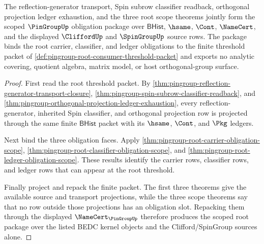 \begin{theorem}
\label{thm:pingroup-root-scoped-obligation-package}
The reflection-generator transport, Spin subrow classifier readback,
orthogonal projection ledger exhaustion, and the three root scope theorems
jointly form the scoped $\PinGroupUp$ obligation package over
$\mathsf{BHist}$, $\hsame$, $\Cont$, $\NameCert$, and the displayed
$\CliffordUp$ and $\SpinGroupUp$ source rows. The package binds the root
carrier, classifier, and ledger obligations to the finite threshold packet of
\autoref{def:pingroup-root-consumer-threshold-packet} and exports no analytic
covering, quotient algebra, matrix model, or host orthogonal-group surface.
\end{theorem}
\begin{proof}
First read the root threshold packet. By
\autoref{thm:pingroup-reflection-generator-transport-closure},
\autoref{thm:pingroup-spin-subrow-classifier-readback}, and
\autoref{thm:pingroup-orthogonal-projection-ledger-exhaustion}, every
reflection-generator, inherited Spin classifier, and orthogonal projection
row is projected through the same finite $\mathsf{BHist}$ packet with its
$\hsame$, $\Cont$, and $\Pkg$ ledgers.

Next bind the three obligation faces. Apply
\autoref{thm:pingroup-root-carrier-obligation-scope},
\autoref{thm:pingroup-root-classifier-obligation-scope}, and
\autoref{thm:pingroup-root-ledger-obligation-scope}. These results identify
the carrier rows, classifier rows, and ledger rows that can appear at the
root threshold.

Finally project and repack the finite packet. The first three theorems give
the available source and transport projections, while the three scope
theorems say that no row outside those projections has an obligation slot.
Repacking them through the displayed $\NameCert_{\PinGroupUp}$ therefore
produces the scoped root package over the listed BEDC kernel objects and the
Clifford/SpinGroup sources alone.
\end{proof}
